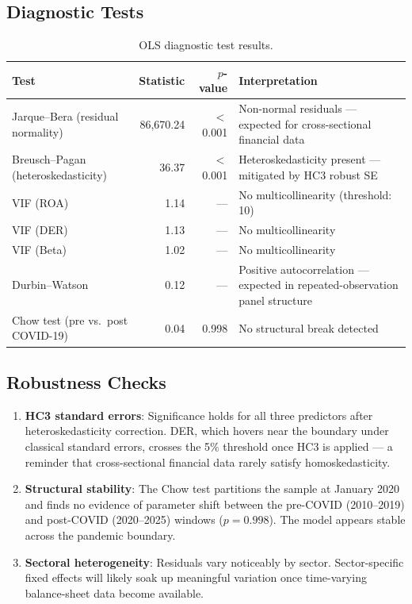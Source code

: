 \documentclass[11pt,a4paper]{article}
\begin{document}
\subsection{Diagnostic Tests}

\begin{table}[H]
\centering
\caption{OLS diagnostic test results.}
\label{tab:diag}
\begin{tabular}{l r r p{6.5cm}}
\toprule
\textbf{Test} & \textbf{Statistic} & \textbf{$p$-value} & \textbf{Interpretation} \\
\midrule
Jarque--Bera (residual normality)   & 86{,}670.24 & $<$0.001 & Non-normal residuals — expected for cross-sectional financial data \\
Breusch--Pagan (heteroskedasticity) & 36.37       & $<$0.001 & Heteroskedasticity present — mitigated by HC3 robust SE \\
VIF (ROA)                           & 1.14        & —        & No multicollinearity (threshold: 10) \\
VIF (DER)                           & 1.13        & —        & No multicollinearity \\
VIF (Beta)                          & 1.02        & —        & No multicollinearity \\
Durbin--Watson                      & 0.12        & —        & Positive autocorrelation — expected in repeated-observation panel structure \\
Chow test (pre vs.\ post COVID-19)  & 0.04        & 0.998    & No structural break detected \\
\bottomrule
\end{tabular}
\end{table}

\subsection{Robustness Checks}

\begin{enumerate}[leftmargin=*,nosep]
\item \textbf{HC3 standard errors}: Significance holds for all three predictors after heteroskedasticity correction. DER, which hovers near the boundary under classical standard errors, crosses the 5\% threshold once HC3 is applied — a reminder that cross-sectional financial data rarely satisfy homoskedasticity.
\item \textbf{Structural stability}: The Chow test partitions the sample at January 2020 and finds no evidence of parameter shift between the pre-COVID (2010--2019) and post-COVID (2020--2025) windows ($p = 0.998$). The model appears stable across the pandemic boundary.
\item \textbf{Sectoral heterogeneity}: Residuals vary noticeably by sector. Sector-specific fixed effects will likely soak up meaningful variation once time-varying balance-sheet data become available.
\end{enumerate}
\end{document}
